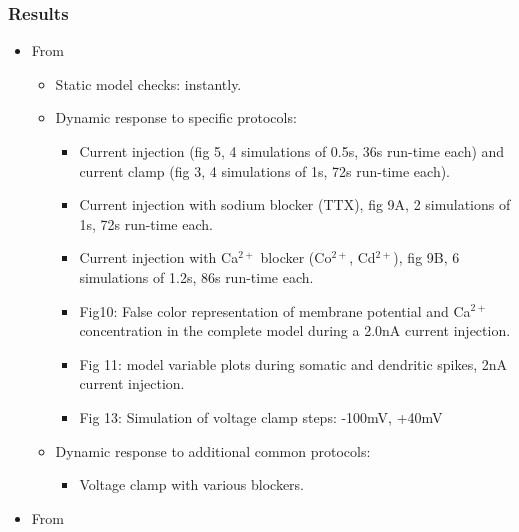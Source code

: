 \documentclass[12pt]{article}
\begin{document}
\subsubsection*{Results}

\begin{itemize}
\item From~\cite{De-Schutter-E:1994vn}

  \begin{itemize}
  \item Static model checks: instantly.
  \item Dynamic response to specific protocols:
    \begin{itemize}
    \item Current injection (fig 5, 4 simulations of 0.5s, 36s
      run-time each) and current clamp (fig 3, 4 simulations of 1s,
      72s run-time each).
    \item Current injection with sodium blocker (TTX), fig 9A, 2
      simulations of 1s, 72s run-time each.
    \item Current injection with Ca$^{2+}$ blocker (Co$^{2+}$,
      Cd$^{2+}$), fig 9B, 6 simulations of 1.2s, 86s run-time each.
    \item Fig10: False color representation of membrane potential and Ca$^{2+}$
      concentration in the complete model during a 2.0nA current
      injection.
    \item Fig 11: model variable plots during somatic and dendritic
      spikes, 2nA current injection.
    \item Fig 13: Simulation of voltage clamp steps: -100mV, +40mV
    \end{itemize}
  \item Dynamic response to additional common protocols:
    \begin{itemize}
    \item Voltage clamp with various blockers.
    \end{itemize}

  \end{itemize}


\item From~\cite{E:1994hc}


\end{itemize}
\end{document}
